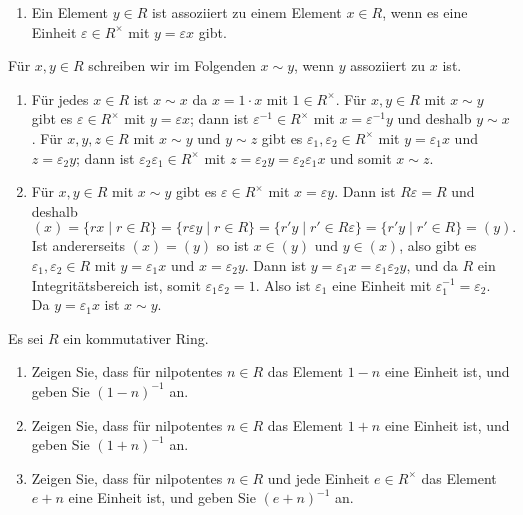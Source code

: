 \begin{solution}
  \begin{enumerate}
    \item
      Ein Element $y \in R$ ist assoziiert zu einem Element $x \in R$, wenn es eine Einheit $\varepsilon \in R^\times$ mit $y = \varepsilon x$ gibt.
  \end{enumerate}
  Für $x, y \in R$ schreiben wir im Folgenden $x \sim y$, wenn $y$ assoziiert zu $x$ ist.
  \begin{enumerate}[resume]
    \item
      Für jedes $x \in R$ ist $x \sim x$ da $x = 1 \cdot x$ mit $1 \in R^\times$.
      Für $x, y \in R$ mit $x \sim y$ gibt es $\varepsilon \in R^\times$ mit $y = \varepsilon x$;
      dann ist $\varepsilon^{-1} \in R^\times$ mit $x = \varepsilon^{-1} y$ und deshalb $y \sim x$.
      Für $x, y, z \in R$ mit $x \sim y$ und $y \sim z$ gibt es $\varepsilon_1, \varepsilon_2 \in R^\times$ mit $y = \varepsilon_1 x$ und $z = \varepsilon_2 y$;
      dann ist $\varepsilon_2 \varepsilon_1 \in R^\times$ mit $z = \varepsilon_2 y = \varepsilon_2 \varepsilon_1 x$ und somit $x \sim z$.
    \item
      Für $x, y \in R$ mit $x \sim y$ gibt es $\varepsilon \in R^\times$ mit $x = \varepsilon y$.
      Dann ist $R \varepsilon = R$ und deshalb
      \[
          (x)
        = \{r x \mid r \in R\}
        = \{r \varepsilon y \mid r \in R\}
        = \{r' y \mid r' \in R \varepsilon\}
        = \{r' y \mid r' \in R\}
        = (y).
      \]
      Ist andererseits $(x) = (y)$ so ist $x \in (y)$ und $y \in (x)$, also gibt es $\varepsilon_1, \varepsilon_2 \in R$ mit $y = \varepsilon_1 x$ und $x = \varepsilon_2 y$.
      Dann ist $y = \varepsilon_1 x = \varepsilon_1 \varepsilon_2 y$, und da $R$ ein Integritätsbereich ist, somit $\varepsilon_1 \varepsilon_2 = 1$.
      Also ist $\varepsilon_1$ eine Einheit mit $\varepsilon_1^{-1} = \varepsilon_2$.
      Da $y = \varepsilon_1 x$ ist $x \sim y$.
  \end{enumerate}
\end{solution}


\begin{question}
  Es sei $R$ ein kommutativer Ring.
  \begin{enumerate}
    \item
      Zeigen Sie, dass für nilpotentes $n \in R$ das Element $1 - n$ eine Einheit ist, und geben Sie $(1 - n)^{-1}$ an.
    \item
      Zeigen Sie, dass für nilpotentes $n \in R$ das Element $1 + n$ eine Einheit ist, und geben Sie $(1 + n)^{-1}$ an.
    \item
      Zeigen Sie, dass für nilpotentes $n \in R$ und jede Einheit $e \in R^\times$ das Element $e + n$ eine Einheit ist, und geben Sie $(e + n)^{-1}$ an.
  \end{enumerate}
\end{question}


